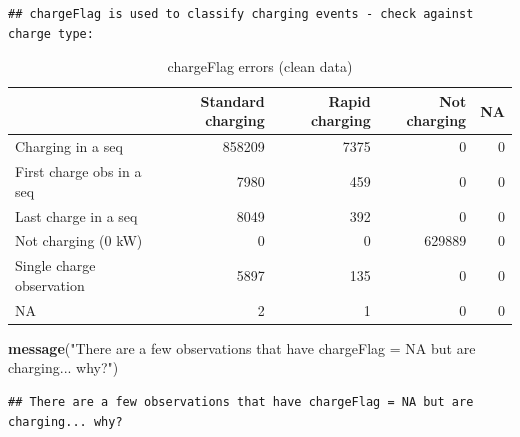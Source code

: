 \documentclass[]{article}
\newenvironment{Shaded}{\begin{snugshade}}{\end{snugshade}}
\newcommand{\DataTypeTok}[1]{\textcolor[rgb]{0.13,0.29,0.53}{#1}}
\newcommand{\KeywordTok}[1]{\textcolor[rgb]{0.13,0.29,0.53}{\textbf{#1}}}
\newcommand{\NormalTok}[1]{#1}
\newcommand{\OperatorTok}[1]{\textcolor[rgb]{0.81,0.36,0.00}{\textbf{#1}}}
\newcommand{\StringTok}[1]{\textcolor[rgb]{0.31,0.60,0.02}{#1}}
\begin{document}
\begin{verbatim}
## chargeFlag is used to classify charging events - check against charge type:
\end{verbatim}

\begin{Shaded}
\end{Shaded}

\begin{table}[t]

\caption{\label{tab:checkChargeFlags}chargeFlag errors (clean data)}
\centering
\begin{tabular}{l|r|r|r|r}
\hline
  & Standard charging & Rapid charging & Not charging & NA\\
\hline
Charging in a seq & 858209 & 7375 & 0 & 0\\
\hline
First charge obs in a seq & 7980 & 459 & 0 & 0\\
\hline
Last charge in a seq & 8049 & 392 & 0 & 0\\
\hline
Not charging (0 kW) & 0 & 0 & 629889 & 0\\
\hline
Single charge observation & 5897 & 135 & 0 & 0\\
\hline
NA & 2 & 1 & 0 & 0\\
\hline
\end{tabular}
\end{table}

\begin{Shaded}
\begin{Highlighting}[]
\KeywordTok{message}\NormalTok{(}\StringTok{"There are a few observations that have chargeFlag = NA but are charging... why?"}\NormalTok{)}
\end{Highlighting}
\end{Shaded}

\begin{verbatim}
## There are a few observations that have chargeFlag = NA but are charging... why?
\end{verbatim}
\end{document}
